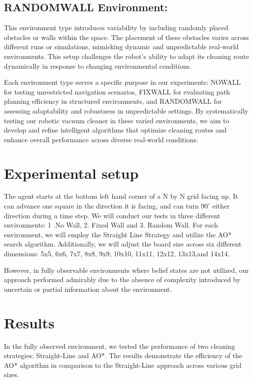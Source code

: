 \documentclass{article}
\begin{document}
\subsection{RANDOMWALL Environment:} This environment type introduces variability by including randomly placed obstacles or walls within the space. The placement of these obstacles varies across different runs or simulations, mimicking dynamic and unpredictable real-world environments. This setup challenges the robot's ability to adapt its cleaning route dynamically in response to changing environmental conditions.


Each environment type serves a specific purpose in our experiments: NOWALL for testing unrestricted navigation scenarios, FIXWALL for evaluating path planning efficiency in structured environments, and RANDOMWALL for assessing adaptability and robustness in unpredictable settings. By systematically testing our robotic vacuum cleaner in these varied environments, we aim to develop and refine intelligent algorithms that optimize cleaning routes and enhance overall performance across diverse real-world conditions.

\section{Experimental setup}
The agent starts at the bottom left hand corner of a N by N grid facing up. 
It can advance one square in the direction it is facing, and can turn $90^\circ$ either direction during a time step. 
We will conduct our tests in three different environments: 1 .No Wall, 2. Fixed Wall and 3. Random Wall.
For each environment, we will employ the Straight Line Strategy and utilize the AO* search algorithm. Additionally, we will adjust the board size across six different dimensions: 5x5, 6x6, 7x7, 8x8, 9x9, 10x10, 11x11, 12x12, 13x13,and 14x14.

 However, in fully observable environments where belief states are not utilized, our approach performed admirably due to the absence of complexity introduced by uncertain or partial information about the environment.



\section{Results}
In the fully observed environment, we tested the performance of two cleaning strategies: Straight-Line and AO*. The results demonstrate the efficiency of the AO* algorithm in comparison to the Straight-Line approach across various grid sizes.
\end{document}
